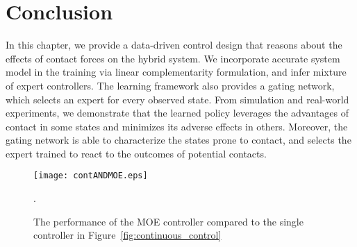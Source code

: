 \section{Conclusion}
\label{sec:moe_conclusion}

In this chapter, we provide a data-driven control design that reasons about the
effects of contact forces on the hybrid system.
%
We incorporate accurate system model in the training via linear complementarity
formulation, and infer mixture of expert controllers.
%
The learning framework also provides a gating network, which selects an expert
for every observed state.
%
From simulation and real-world experiments, we demonstrate that the learned
policy leverages the advantages of contact in some states and minimizes its
adverse effects in others.
%
Moreover, the gating network is able to characterize the states prone to
contact, and selects the expert trained to react to the outcomes of potential
contacts.

\begin{figure}[H]
    \centering
    \texttt{[image: contANDMOE.eps]}
    \caption{The performance of the MOE controller compared to the single
    controller in Figure~\ref{fig:continuous_control}}.
    \label{fig:contandmoe}
\end{figure}